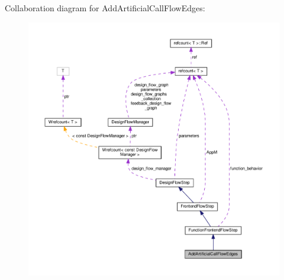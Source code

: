 Collaboration diagram for Add\+Artificial\+Call\+Flow\+Edges\+:
\nopagebreak
\begin{figure}[H]
\begin{center}
\leavevmode
\includegraphics[width=350pt]{d3/d06/classAddArtificialCallFlowEdges__coll__graph}
\end{center}
\end{figure}
